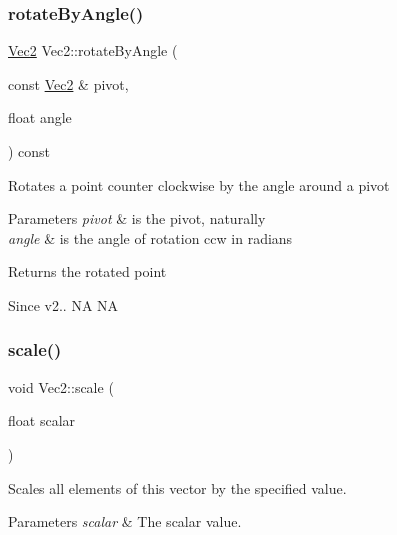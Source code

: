 \subsubsection{\texorpdfstring{rotate\+By\+Angle()}{rotateByAngle()}\hspace{0.1cm}{\footnotesize\ttfamily [2/2]}}
{\footnotesize\ttfamily \hyperlink{classVec2}{Vec2} Vec2\+::rotate\+By\+Angle (\begin{DoxyParamCaption}\item[{const \hyperlink{classVec2}{Vec2} \&}]{pivot,  }\item[{float}]{angle }\end{DoxyParamCaption}) const}

Rotates a point counter clockwise by the angle around a pivot 
\begin{DoxyParams}{Parameters}
{\em pivot} & is the pivot, naturally \\
\hline
{\em angle} & is the angle of rotation ccw in radians \\
\hline
\end{DoxyParams}
\begin{DoxyReturn}{Returns}
the rotated point 
\end{DoxyReturn}
\begin{DoxySince}{Since}
v2..  NA  NA 
\end{DoxySince}
\mbox{\label{classVec2_a67d98d1e2261ae9369bd79c337187cd8}} 
\subsubsection{\texorpdfstring{scale()}{scale()}\hspace{0.1cm}{\footnotesize\ttfamily [1/4]}}
{\footnotesize\ttfamily void Vec2\+::scale (\begin{DoxyParamCaption}\item[{float}]{scalar }\end{DoxyParamCaption})\hspace{0.3cm}{\ttfamily [inline]}}

Scales all elements of this vector by the specified value.


\begin{DoxyParams}{Parameters}
{\em scalar} & The scalar value. \\
\hline
\end{DoxyParams}
\mbox{\label{classVec2_ae2c74b30190869c962302065cfeecf8c}} 
